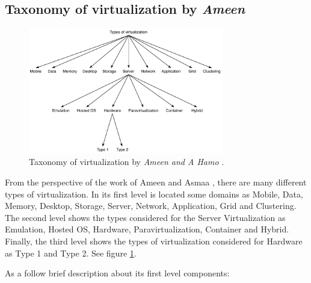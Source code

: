 	\subsection{Taxonomy of virtualization by \textit{Ameen}}
	
	\begin{figure}[H]
		\centering
		\includegraphics[width=8.5cm]{images/AmeenAndHamo2003.pdf}
		\caption{Taxonomy of virtualization by \textit{Ameen and A Hamo} \cite{Ameen2013}.} 
		\label{fig:TaxonomyOfVirtualizationByAmeen}
	\end{figure}



    From the perspective of the work of Ameen and Asmaa \cite{Ameen2013}, there are many different types of virtualization. In its first level is located some domains as  Mobile, Data, Memory, Desktop, Storage, Server, Network, Application, Grid and Clustering. The second level shows the types considered for the Server Virtualization as Emulation, Hosted OS, Hardware, Paravirtualization, Container and Hybrid. Finally, the third level shows the types of virtualization considered for Hardware as Type 1 and Type 2. See figure \ref{fig:TaxonomyOfVirtualizationByAmeen}.
    
    As a follow brief description about its first level components:
    
